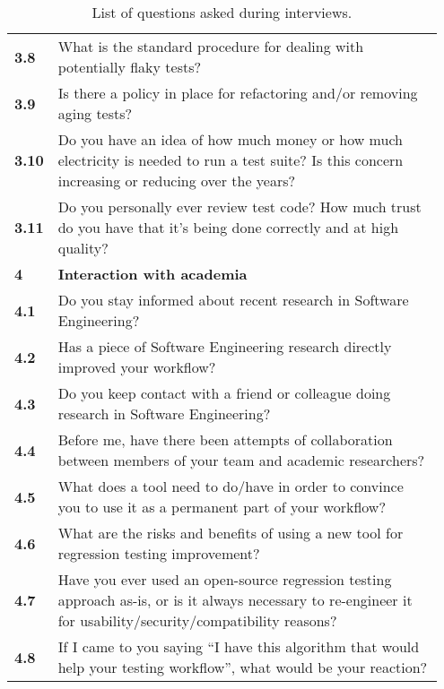 \begin{table}[h!]
\begin{tabular}{p{0.05\linewidth}p{0.9\linewidth}}
\textbf{3.8} & What is the standard procedure for dealing with potentially flaky tests? \\
\textbf{3.9} & Is there a policy in place for refactoring and/or removing aging tests? \\
\textbf{3.10} & Do you have an idea of how much money or how much electricity is needed to run a test suite? Is this concern increasing or reducing over the years? \\
\textbf{3.11} & Do you personally ever review test code? How much trust do you have that it's being done correctly and at high quality? \\
\midrule
\textbf{4} & \textbf{Interaction with academia} \\
\textbf{4.1} & Do you stay informed about recent research in Software Engineering? \\
\textbf{4.2} & Has a piece of Software Engineering research directly improved your workflow? \\
\textbf{4.3} & Do you keep contact with a friend or colleague doing research in Software Engineering? \\
\textbf{4.4} & Before me, have there been attempts of collaboration between members of your team and academic researchers? \\
\textbf{4.5} & What does a tool need to do/have in order to convince you to use it as a permanent part of your workflow? \\
\textbf{4.6} & What are the risks and benefits of using a new tool for regression testing improvement? \\
\textbf{4.7} & Have you ever used an open-source regression testing approach as-is, or is it always necessary to re-engineer it for usability/security/compatibility reasons? \\
\textbf{4.8} & If I came to you saying ``I have this algorithm that would help your testing workflow'', what would be your reaction? \\
\bottomrule
\end{tabular}\\
\caption{List of questions asked during interviews.}
\label{table:interview_questions}
\end{table}